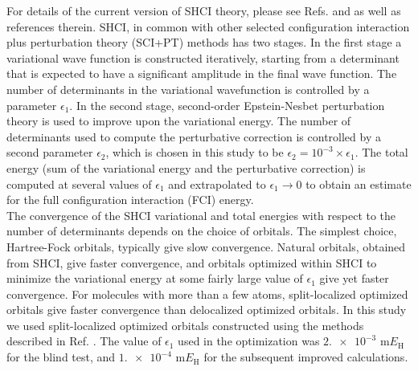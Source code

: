 \documentclass[journal=jcp,manuscript=suppinfo]{achemso}
\begin{document}
For details of the current version of SHCI theory, please see Refs.  and  as well as references therein. SHCI, in common with other selected configuration interaction plus perturbation theory (SCI+PT) methods has two stages. In the first stage a variational wave function is constructed iteratively, starting from a determinant that is expected to have a significant amplitude in the final wave function. The number of determinants in the variational wavefunction is controlled by a parameter $\epsilon_1$. In the second stage, second-order Epstein-Nesbet perturbation theory is used to improve upon the variational energy. The number of determinants used to compute the perturbative correction is controlled by a second parameter $\epsilon_2$, which is chosen in this study to be $\epsilon_2 = 10^{-3} \times \epsilon_1$. The total energy (sum of the variational energy and the perturbative correction) is computed at several values of $\epsilon_1$ and extrapolated to $\epsilon_1 \to 0$ to obtain an estimate for the full configuration interaction (FCI) energy.\\

The convergence of the SHCI variational and total energies with respect to the number of determinants depends on the choice of orbitals. The simplest choice, Hartree-Fock orbitals, typically give slow convergence. Natural orbitals, obtained from SHCI, give faster convergence, and orbitals optimized within SHCI to minimize the variational energy at some fairly large value of $\epsilon_1$ give yet faster convergence. For molecules with more than a few atoms, split-localized optimized orbitals give faster convergence than delocalized optimized orbitals. In this study we used split-localized optimized orbitals constructed using the methods described in Ref. . The value of $\epsilon_1$ used in the optimization was $\num{2.e-3}$ m$E_{\text{H}}$ for the blind test, and $\num{1.e-4}$ m$E_{\text{H}}$ for the subsequent improved calculations.\\
\end{document}
